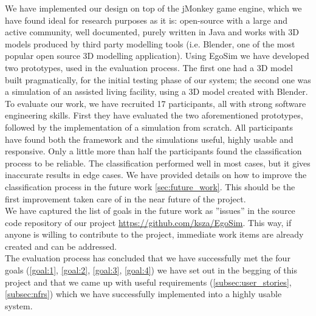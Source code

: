 We have implemented our design on top of the jMonkey game engine, which we have found ideal for research purposes as it is: open-source with a large and active community, well documented, purely written in Java and works with 3D models produced by third party modelling tools (i.e. Blender, one of the most popular open source 3D modelling application). Using EgoSim we have developed two prototypes, used in the evaluation process. The first one had a 3D model built pragmatically, for the initial testing phase of our system; the second one was a simulation of an assisted living facility, using a 3D model created with Blender.\\

To evaluate our work, we have recruited 17 participants, all with strong software engineering skills. First they have evaluated the two aforementioned prototypes, followed by the implementation of a simulation from scratch. All participants have found both the framework and the simulations useful, highly usable and responsive. Only a little more than half the participants found the classification process to be reliable. The classification performed well in most cases, but it gives inaccurate results in edge cases. We have provided details on how to improve the classification process in the future work \ref{sec:future_work}. This should be the first improvement taken care of in the near future of the project.\\

We have captured the list of goals in the future work as ''issues'' in the source code repository of our project \url{https://github.com/ksza/EgoSim}. This way, if anyone is willing to contribute to the project, immediate work items are already created and can be addressed.\\

The evaluation process has concluded that we have successfully met the four goals (\ref{goal:1}, \ref{goal:2}, \ref{goal:3}, \ref{goal:4}) we have set out in the begging of this project and that we came up with useful requirements (\ref{subsec:user_stories}, \ref{subsec:nfrs}) which we have successfully implemented into a highly usable system.\\





